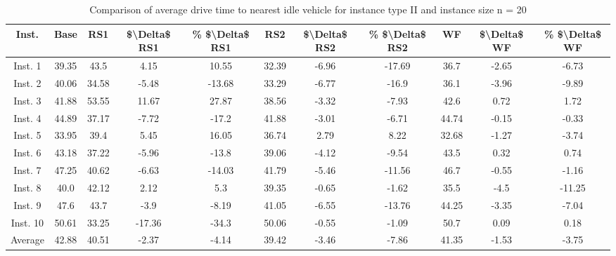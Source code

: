 \begin{table}[H]
\centering
\begin{tabular}{ccccccccccc}
  \hline
  \textbf{Inst.} & \textbf{Base} & \textbf{RS1} & \textbf{\$\textbackslash{}Delta\$  RS1} & \textbf{\% \$\textbackslash{}Delta\$  RS1} & \textbf{RS2} & \textbf{\$\textbackslash{}Delta\$  RS2} & \textbf{\% \$\textbackslash{}Delta\$  RS2} & \textbf{WF} & \textbf{\$\textbackslash{}Delta\$  WF} & \textbf{\% \$\textbackslash{}Delta\$  WF} \\\hline
  Inst. 1 & 39.35 & 43.5 & 4.15 & 10.55 & 32.39 & -6.96 & -17.69 & 36.7 & -2.65 & -6.73 \\
  Inst. 2 & 40.06 & 34.58 & -5.48 & -13.68 & 33.29 & -6.77 & -16.9 & 36.1 & -3.96 & -9.89 \\
  Inst. 3 & 41.88 & 53.55 & 11.67 & 27.87 & 38.56 & -3.32 & -7.93 & 42.6 & 0.72 & 1.72 \\
  Inst. 4 & 44.89 & 37.17 & -7.72 & -17.2 & 41.88 & -3.01 & -6.71 & 44.74 & -0.15 & -0.33 \\
  Inst. 5 & 33.95 & 39.4 & 5.45 & 16.05 & 36.74 & 2.79 & 8.22 & 32.68 & -1.27 & -3.74 \\
  Inst. 6 & 43.18 & 37.22 & -5.96 & -13.8 & 39.06 & -4.12 & -9.54 & 43.5 & 0.32 & 0.74 \\
  Inst. 7 & 47.25 & 40.62 & -6.63 & -14.03 & 41.79 & -5.46 & -11.56 & 46.7 & -0.55 & -1.16 \\
  Inst. 8 & 40.0 & 42.12 & 2.12 & 5.3 & 39.35 & -0.65 & -1.62 & 35.5 & -4.5 & -11.25 \\
  Inst. 9 & 47.6 & 43.7 & -3.9 & -8.19 & 41.05 & -6.55 & -13.76 & 44.25 & -3.35 & -7.04 \\
  Inst. 10 & 50.61 & 33.25 & -17.36 & -34.3 & 50.06 & -0.55 & -1.09 & 50.7 & 0.09 & 0.18 \\
  Average & 42.88 & 40.51 & -2.37 & -4.14 & 39.42 & -3.46 & -7.86 & 41.35 & -1.53 & -3.75 \\\hline
\end{tabular}
\caption{Comparison of average drive time to nearest idle vehicle for instance type II and instance size n = 20}
\label{tab:wait:resrelocation-nearest-drive-time-comparison_II_20}
\end{table}
